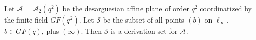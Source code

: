 Let $\mathcal{A} = \mathcal{A}_2(q^2)$ be the desarguesian affine plane of order $q^2$ coordinatized by the finite field $GF(q^2)$. Let $\mathcal{S}$ be the subset of all points $(b)$ on $\ell_{\infty}$, $b \in GF(q)$, plus $(\infty)$. Then $\mathcal{S}$ is a derivation set for $\mathcal{A}$.
